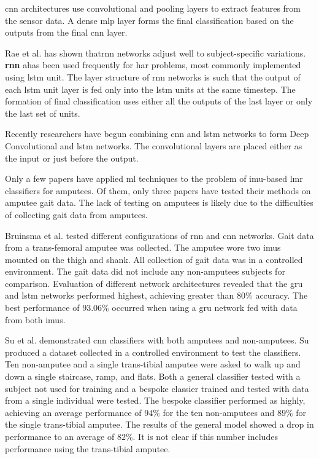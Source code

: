 \acrshort{cnn} architectures use convolutional and pooling layers to extract features from the sensor data. A dense \acrshort{mlp} layer forms the final classification based on the outputs from the final \acrshort{cnn} layer. \cite{Jiang2015, Lu2020, Martinez-Hernandez2021} 

Rae et al. has shown that\acrshort{rnn} networks adjust well to subject-specific variations\cite{Rai2019a}. \textbf{rnn} ahas been used frequently for \acrshort{har} problems, most commonly implemented using \acrshort{lstm} unit. The layer structure of \acrshort{rnn} networks is such that the output of each \acrshort{lstm} unit layer is fed only into the \acrshort{lstm} units at the same timestep. The formation of final classification uses either all the outputs of the last layer or only the last set of units.\cite{Yu2018, Uddin2021a}

Recently researchers have begun combining \acrshort{cnn} and \acrshort{lstm} networks to form Deep Convolutional and \acrshort{lstm} networks\cite{Ordonez2016}. The convolutional layers are placed either as the input or just before the output.\cite{Mutegeki2020, Xia2020}


Only a few papers have applied \acrshort{ml} techniques to the problem of \acrshort{imu}-based \acrshort{lmr} classifiers for amputees. Of them, only three papers have tested their methods on amputee gait data\cite{Lu2020, Bruinsma2021, Jamieson2021}. The lack of testing on amputees is likely due to the difficulties of collecting gait data from amputees\cite{Gardiner2016}.

Bruinsma et al. tested different configurations of \acrshort{rnn} and \acrshort{cnn} networks. Gait data from a trans-femoral amputee was collected. The amputee wore two \acrshort{imu}s mounted on the thigh and shank. All collection of gait data was in a controlled environment. The gait data did not include any non-amputees subjects for comparison. Evaluation of different network architectures revealed that the \acrfull{gru} and \acrshort{lstm} networks performed highest, achieving greater than 80\% accuracy. The best performance of  93.06\% occurred when using a \acrshort{gru} network fed with data from both \acrshort{imu}s.\cite{Bruinsma2021}

Su et al. demonstrated \acrshort{cnn} classifiers with both amputees and non-amputees. Su produced a dataset collected in a controlled environment to test the classifiers. Ten non-amputee and a single trans-tibial amputee were asked to walk up and down a single staircase, ramp, and flats. Both a general classifier tested with a subject not used for training and a bespoke classier trained and tested with data from a single individual were tested. The bespoke classifier performed as highly, achieving an average performance of $94\%$ for the ten non-amputees and $89\%$ for the single trans-tibial amputee. The results of the general model showed a drop in performance to an average of $82\%$. It is not clear if this number includes performance using the trans-tibial amputee.\cite{Su2019}

